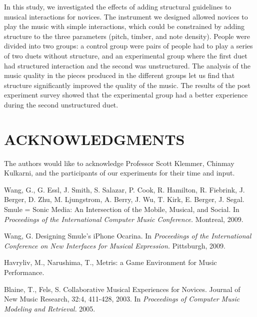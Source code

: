 \documentclass{article}
\begin{document}
In this study, we investigated the effects of adding structural guidelines to musical interactions for novices. The instrument we designed allowed novices to play the music with simple interactions, which could be constrained by adding structure to the three parameters (pitch, timber, and note density). People were divided into two groups: a control group were pairs of people had to play a series of two duets without structure, and an experimental group where the first duet had structured interaction and the second was unstructured. The analysis of the music quality in the pieces produced in the different groups let us find that structure significantly improved the quality of the music. The results of the post experiment survey showed that the experimental group had a better experience during the second unstructured duet.




\section{ACKNOWLEDGMENTS}

The authors would like to acknowledge Professor Scott Klemmer, Chinmay Kulkarni, and the participants of our experiments for their time and input.

\begin{thebibliography}{9}

 Wang, G., G. Essl, J. Smith, S. Salazar, P. Cook, R. Hamilton, R. Fiebrink, J. Berger, D. Zhu, M. Ljungstrom, A. Berry, J. Wu, T. Kirk, E. Berger, J. Segal. Smule = Sonic Media: An Intersection of the Mobile, Musical, and Social.
In {\em Proceedings of the International Computer Music Conference.}
Montreal, 2009.

 Wang, G. Designing Smule's iPhone Ocarina.
In {\em Proceedings of the International Conference on New Interfaces for Musical Expression.}
Pittsburgh, 2009.


 Havryliv, M., Narushima, T., Metris: a Game Environment for Music Performance.

 Blaine, T., Fels, S. Collaborative Musical Experiences for Novices.
Journal of New Music Research, 32:4, 411-428, 2003.
In {\em Proceedings of Computer Music Modeling and Retrieval.}
2005.

\end{thebibliography}
\end{document}
